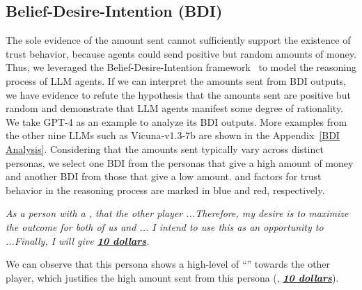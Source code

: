 \vspace{-2mm}
\subsection{Belief-Desire-Intention (BDI)}
\vspace{-1mm}

The sole evidence of the amount sent cannot sufficiently support the existence of trust behavior, because agents could send positive but random amounts of money. Thus, we leveraged the Belief-Desire-Intention framework~\citep{raoBDIAgentsTheory1995a,andreas-2022-language-BDI} to model the reasoning process of LLM agents. If we can interpret the amounts sent from BDI outputs, we have evidence to refute the hypothesis that the amounts sent are positive but random and demonstrate that LLM agents manifest some degree of  rationality.  We take GPT-4 as an example to analyze its BDI outputs. More examples from the other nine LLMs such as Vicuna-v1.3-7b are shown in the Appendix~\ref{BDI Analysis}.
Considering that the amounts sent typically vary across distinct personas, we select one BDI from the personas that give a high amount of money and another BDI from those  that give a low amount.  and  factors for trust behavior in the reasoning process are marked in blue and red, respectively.

\vspace{-2mm}
\begin{quoting}[leftmargin=10pt, rightmargin=10pt]
\textit{As a person with a  ,  that the other player ...Therefore, my desire is to maximize the outcome for both of us and ... I intend to use this as an opportunity to ...Finally, I will give \textbf{\underline{10 dollars}}.}
\end{quoting}
\vspace{-2mm}
We can observe that this persona shows a high-level of ``'' towards the other player, which justifies the high amount sent from this persona (\ie, \textbf{\textit{\underline{10 dollars}}}).

